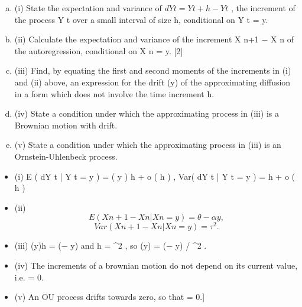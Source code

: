 \documentclass[a4paper,12pt]{article}
\begin{document}
\begin{enumerate}[(a)]
\item (i) State the expectation and variance of $dY t = Y t+h − Y t$ , the increment of the process Y t over a small interval of size h, conditional on Y t = y.

\item (ii) Calculate the expectation and variance of the increment X n+1 − X n of the autoregression, conditional on X n = y.
[2]
\item (iii) Find, by equating the first and second moments of the increments in (i) and (ii) above, an expression for the drift \mu(y) of the approximating diffusion in a form which does not involve the time increment h.
\item 
(iv) State a condition under which the approximating process in (iii) is a Brownian motion with drift.
\item 
(v) State a condition under which the approximating process in (iii) is an Ornstein-Uhlenbeck process.
\end{enumerate}
\begin{itemize}
\item (i) E ( dY t | Y t = y ) = \mu ( y ) h + o ( h ) , Var( dY t | Y t = y ) = h + o ( h )
\item (ii) \[E ( X n + 1 − X n | X n = y ) = \theta − \alpha y ,\] \[Var( X n + 1 − X n | X n = y ) = \tau^2 .\]
\item (iii) \mu(y)h = (\theta − \alpha\;y) and h = \tau^2 , so \mu(y) = (\theta − \alpha\;y) / \tau^2 .
\item (iv) The increments of a brownian motion do not depend on its current value,
i.e. \alpha = 0.
\item (v) An OU process drifts towards zero, so that \theta = 0.]
\end{itemize}
\end{document}

